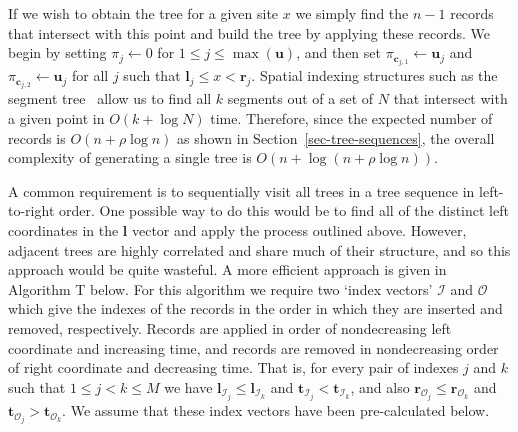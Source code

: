 \documentclass[10pt]{article}
\newcommand{\vect}[1]{\ensuremath{\mathbf{#1}}}
\newcommand{\indexin}[0]{\ensuremath{\mathcal{I}}}
\newcommand{\indexout}[0]{\ensuremath{\mathcal{O}}}
\begin{document}
If we wish to obtain the tree for a given site $x$ we simply find the $n - 1$
records that intersect with this point and build the tree by applying these
records. We begin by setting $\pi_j \leftarrow 0 $ for $1 \leq j \leq
\max(\vect{u})$, and then set $\pi_{\vect{c}_{j, 1}} \leftarrow \vect{u}_{j}$
and $\pi_{\vect{c}_{j, 2}} \leftarrow \vect{u}_{j}$ for all $j$ such that
$\vect{l}_j \leq x < \vect{r}_j$. Spatial indexing structures
such as the segment tree~\citep{s89} allow us to find all $k$ segments out
of a set of $N$ that intersect with a given point in $O(k + \log N)$ time.
Therefore, since the expected number of records is
$O(n + \rho \log n)$ as shown in Section~\ref{sec-tree-sequences},
the overall complexity of generating a single tree
is $O(n + \log(n + \rho \log n))$.

A common requirement is to sequentially visit all trees in a tree sequence in
left-to-right order. One possible way to do this would be to find all of the
distinct left coordinates in the $\vect{l}$ vector and apply the process outlined
above. However, adjacent trees are highly correlated and share much of their
structure, and so this approach would be quite wasteful.
A more efficient approach is given in Algorithm T below. For this algorithm
we require two `index vectors' $\indexin$ and $\indexout$ which give
the indexes of the records in the order in which they are inserted
and removed, respectively. Records are applied in order of nondecreasing
left coordinate and increasing time, and records are removed in nondecreasing
order of right coordinate and decreasing time. That is, for every
pair of indexes $j$ and $k$ such that  $1 \leq j < k \leq M$ we
have $\vect{l}_{\indexin_j} \leq \vect{l}_{\indexin_{k}}$ and
$\vect{t}_{\indexin_j} < \vect{t}_{\indexin_{k}}$, and also
$\vect{r}_{\indexout_j} \leq \vect{r}_{\indexout_{k}}$ and
$\vect{t}_{\indexout_j} > \vect{t}_{\indexout_{k}}$. We assume that
these index vectors have been pre-calculated below.

\end{document}

